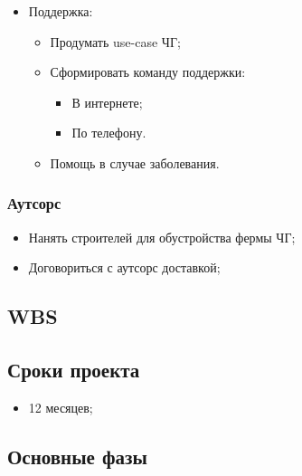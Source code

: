 \documentclass[a4paper,10pt]{article}
\begin{document}
\begin{itemize}
\begin{itemize}
            \end{itemize}
        \item Поддержка:
            \begin{itemize}
                \item Продумать use-case ЧГ;
                \item Сформировать команду поддержки:
                    \begin{itemize}
                        \item В интернете;
                        \item По телефону.
                    \end{itemize}
                \item Помощь в случае заболевания.
            \end{itemize}
    \end{itemize}


\subsubsection{Аутсорс}

    \begin{itemize}
        \item Нанять строителей для обустройства фермы ЧГ;
        \item Договориться с аутсорс доставкой;
    \end{itemize}

\subsection{WBS}



\subsection{Сроки проекта}

    \begin{itemize}
        \item 12 месяцев;
    \end{itemize}

\subsection{Основные фазы}
\end{document}
